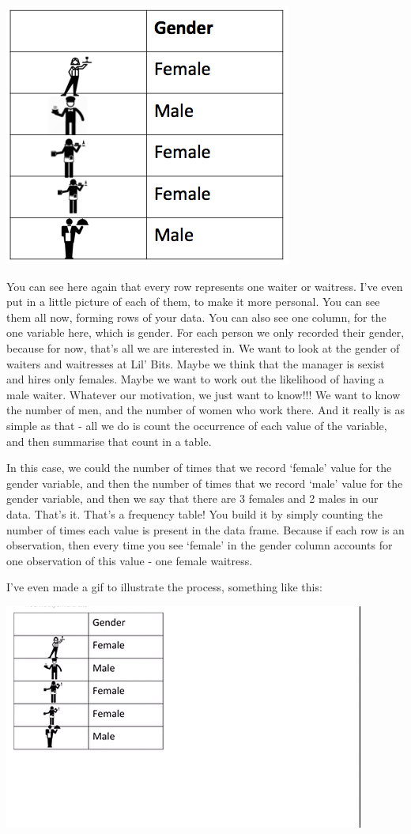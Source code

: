 \documentclass[
]{book}
\begin{document}
\includegraphics{imgs/waiter_heights.png}

You can see here again that every row represents one waiter or waitress. I've even put in a little picture of each of them, to make it more personal. You can see them all now, forming rows of your data. You can also see one column, for the one variable here, which is gender. For each person we only recorded their gender, because for now, that's all we are interested in. We want to look at the gender of waiters and waitresses at Lil' Bits. Maybe we think that the manager is sexist and hires only females. Maybe we want to work out the likelihood of having a male waiter. Whatever our motivation, we just want to know!!! We want to know the number of men, and the number of women who work there. And it really is as simple as that - all we do is count the occurrence of each value of the variable, and then summarise that count in a table.

In this case, we could the number of times that we record `female' value for the gender variable, and then the number of times that we record `male' value for the gender variable, and then we say that there are 3 females and 2 males in our data. That's it. That's a frequency table! You build it by simply counting the number of times each value is present in the data frame. Because if each row is an observation, then every time you see `female' in the gender column accounts for one observation of this value - one female waitress.

I've even made a gif to illustrate the process, something like this:

\includegraphics{imgs/freq_table_gif.gif}
\end{document}
